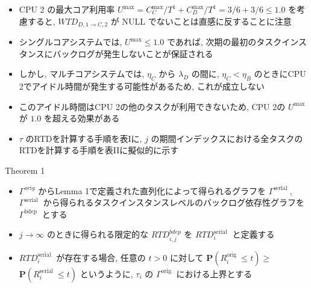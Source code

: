 \begin{frame}{}
    \begin{itemize}
        \item CPU 2 の最大コア利用率 $U^{\max }=C_{C}^{\max } / T^{1}+C_{D}^{\max } / T^{1}=3 / 6+3 / 6 \leq 1.0$ を考慮すると, $W T D_{D, 1 \rightarrow C, 2}$ が NULL でないことは直感に反することに注意
\item シングルコアシステムでは, $U^{\max } \leq 1.0$ であれば, 次期の最初のタスクインスタンスにバックログが発生しないことが保証される
\item しかし, マルチコアシステムでは, $\eta_{C}$ から $\lambda_{D}$ の間に, $\eta_{C}<\eta_{B}$ のときにCPU 2でアイドル時間が発生する可能性があるため, これが成立しない
\item このアイドル時間はCPU 2の他のタスクが利用できないため, CPU 2の $U^{\max }$ が $1.0$ を超える効果がある
    \end{itemize}
\end{frame}

\begin{frame}{}
    \begin{itemize}
        \item $\tau$ のRTDを計算する手順を表Iに, $j$ の期間インデックスにおける全タスクのRTDを計算する手順を表IIに擬似的に示す
    \end{itemize}
\end{frame}

\begin{frame}[label=theorem1]{Theorem 1}
    \begin{theorem}[]
        \begin{itemize}
            \item $\Gamma^{o r i g}$ からLemma 1で定義された直列化によって得られるグラフを $\Gamma^{\text {serial }}$, $\Gamma^{\text {serial }}$ から得られるタスクインスタンスレベルのバックログ依存性グラフを $\Gamma^{\text {bdep }}$ とする
\item $j \rightarrow \infty$ のときに得られる限定的な $R T D_{i, j}^{b d e p}$ を $R T D_{i}^{\text {serial }}$ と定義する
\item $R T D_{i}^{\text {serial }}$ が存在する場合, 任意の $t>0$ に対して $\mathbf{P}\left(R_{i}^{\text {orig }} \leq t\right) \geq$  $\mathbf{P}\left(R_{i}^{\text {serial }} \leq t\right)$ というように, $\tau_{i}$ の $\Gamma^{\text {orig }}$ における上界とする
        \end{itemize}
    \end{theorem}
\end{frame}


